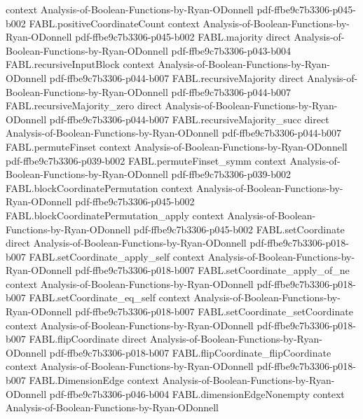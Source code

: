 \begin{theorem}
  {context}
  {Analysis-of-Boolean-Functions-by-Ryan-ODonnell}
  {pdf-ffbe9c7b3306-p045-b002}
\proofstep
  {FABL.positiveCoordinateCount}
  {context}
  {Analysis-of-Boolean-Functions-by-Ryan-ODonnell}
  {pdf-ffbe9c7b3306-p045-b002}
\proofstep
  {FABL.majority}
  {direct}
  {Analysis-of-Boolean-Functions-by-Ryan-ODonnell}
  {pdf-ffbe9c7b3306-p043-b004}
\proofstep
  {FABL.recursiveInputBlock}
  {context}
  {Analysis-of-Boolean-Functions-by-Ryan-ODonnell}
  {pdf-ffbe9c7b3306-p044-b007}
\proofstep
  {FABL.recursiveMajority}
  {direct}
  {Analysis-of-Boolean-Functions-by-Ryan-ODonnell}
  {pdf-ffbe9c7b3306-p044-b007}
\proofstep
  {FABL.recursiveMajority_zero}
  {direct}
  {Analysis-of-Boolean-Functions-by-Ryan-ODonnell}
  {pdf-ffbe9c7b3306-p044-b007}
\proofstep
  {FABL.recursiveMajority_succ}
  {direct}
  {Analysis-of-Boolean-Functions-by-Ryan-ODonnell}
  {pdf-ffbe9c7b3306-p044-b007}
\proofstep
  {FABL.permuteFinset}
  {context}
  {Analysis-of-Boolean-Functions-by-Ryan-ODonnell}
  {pdf-ffbe9c7b3306-p039-b002}
\proofstep
  {FABL.permuteFinset_symm}
  {context}
  {Analysis-of-Boolean-Functions-by-Ryan-ODonnell}
  {pdf-ffbe9c7b3306-p039-b002}
\proofstep
  {FABL.blockCoordinatePermutation}
  {context}
  {Analysis-of-Boolean-Functions-by-Ryan-ODonnell}
  {pdf-ffbe9c7b3306-p045-b002}
\proofstep
  {FABL.blockCoordinatePermutation_apply}
  {context}
  {Analysis-of-Boolean-Functions-by-Ryan-ODonnell}
  {pdf-ffbe9c7b3306-p045-b002}
\proofstep
  {FABL.setCoordinate}
  {direct}
  {Analysis-of-Boolean-Functions-by-Ryan-ODonnell}
  {pdf-ffbe9c7b3306-p018-b007}
\proofstep
  {FABL.setCoordinate_apply_self}
  {context}
  {Analysis-of-Boolean-Functions-by-Ryan-ODonnell}
  {pdf-ffbe9c7b3306-p018-b007}
\proofstep
  {FABL.setCoordinate_apply_of_ne}
  {context}
  {Analysis-of-Boolean-Functions-by-Ryan-ODonnell}
  {pdf-ffbe9c7b3306-p018-b007}
\proofstep
  {FABL.setCoordinate_eq_self}
  {context}
  {Analysis-of-Boolean-Functions-by-Ryan-ODonnell}
  {pdf-ffbe9c7b3306-p018-b007}
\proofstep
  {FABL.setCoordinate_setCoordinate}
  {context}
  {Analysis-of-Boolean-Functions-by-Ryan-ODonnell}
  {pdf-ffbe9c7b3306-p018-b007}
\proofstep
  {FABL.flipCoordinate}
  {direct}
  {Analysis-of-Boolean-Functions-by-Ryan-ODonnell}
  {pdf-ffbe9c7b3306-p018-b007}
\proofstep
  {FABL.flipCoordinate_flipCoordinate}
  {context}
  {Analysis-of-Boolean-Functions-by-Ryan-ODonnell}
  {pdf-ffbe9c7b3306-p018-b007}
\proofstep
  {FABL.DimensionEdge}
  {context}
  {Analysis-of-Boolean-Functions-by-Ryan-ODonnell}
  {pdf-ffbe9c7b3306-p046-b004}
\proofstep
  {FABL.dimensionEdgeNonempty}
  {context}
  {Analysis-of-Boolean-Functions-by-Ryan-ODonnell}

\end{theorem}
